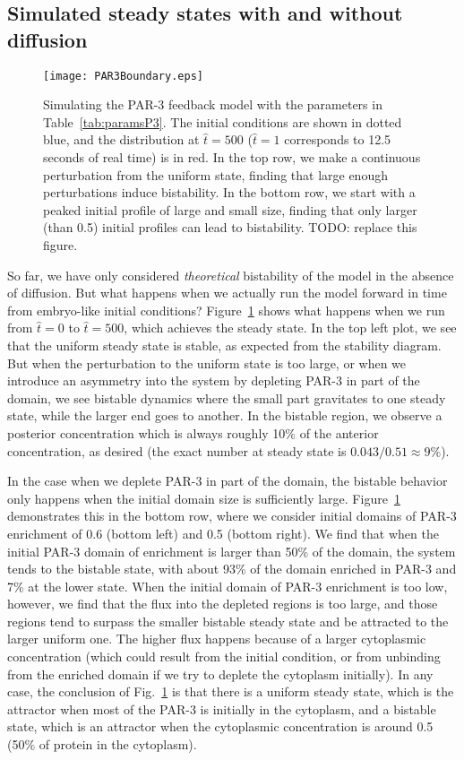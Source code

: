 \documentclass[11pt]{article}
\newcommand{\red}[1]{\color{red}#1\normalcolor}
\newcommand{\6}[1]{#1_{\text{6}}}
\newcommand{\3}[1]{#1_{\text{3}}}
\begin{document}
\subsection{Simulated steady states with and without diffusion}
\begin{figure}
\centering
\texttt{[image: PAR3Boundary.eps]}
\caption{\label{fig:P3FBBd}Simulating the PAR-3 feedback model with the parameters in Table\ \ref{tab:paramsP3}. The initial conditions are shown in dotted blue, and the distribution at $\hat t = 500$ ($\hat t =1$ corresponds to 12.5 seconds of real time) is in red. In the top row, we make a continuous perturbation from the uniform state, finding that large enough perturbations induce bistability. In the bottom row, we start with a peaked initial profile of large and small size, finding that only larger (than 0.5) initial profiles can lead to bistability. \red{TODO: replace this figure.}}
\end{figure}

So far, we have only considered \emph{theoretical} bistability of the model in the absence of diffusion. But what happens when we actually run the model forward in time from embryo-like initial conditions?  Figure\ \ref{fig:P3FBBd} shows what happens when we run from $\hat t = 0$ to $\hat t = 500$, which achieves the steady state. In the top left plot, we see that the uniform steady state is stable, as expected from the stability diagram. But when the perturbation to the uniform state is too large, or when we introduce an asymmetry into the system by depleting PAR-3 in part of the domain, we see bistable dynamics where the small part gravitates to one steady state, while the larger end goes to another. In the bistable region, we observe a posterior concentration which is always roughly 10\% of the anterior concentration, as desired (the exact number at steady state is $0.043/0.51 \approx 9$\%).

In the case when we deplete PAR-3 in part of the domain, the bistable behavior only happens when the initial domain size is sufficiently large. Figure\ \ref{fig:P3FBBd} demonstrates this in the bottom row, where we consider initial domains of PAR-3 enrichment of 0.6 (bottom left) and 0.5 (bottom right). We find that when the initial PAR-3 domain of enrichment is larger than 50\% of the domain, the system tends to the bistable state, with about 93\% of the domain enriched in PAR-3 and 7\% at the lower state. When the initial domain of PAR-3 enrichment is too low, however, we find that the flux into the depleted regions is too large, and those regions tend to surpass the smaller bistable steady state and be attracted to the larger uniform one. The higher flux happens because of a larger cytoplasmic concentration (which could result from the initial condition, or from unbinding from the enriched domain if we try to deplete the cytoplasm initially). In any case, the conclusion of Fig.\ \ref{fig:P3FBBd} is that there is a uniform steady state, which is the attractor when most of the PAR-3 is initially in the cytoplasm, and a bistable state, which is an attractor when the cytoplasmic concentration is around 0.5 (50\% of protein in the cytoplasm). 
\end{document}
